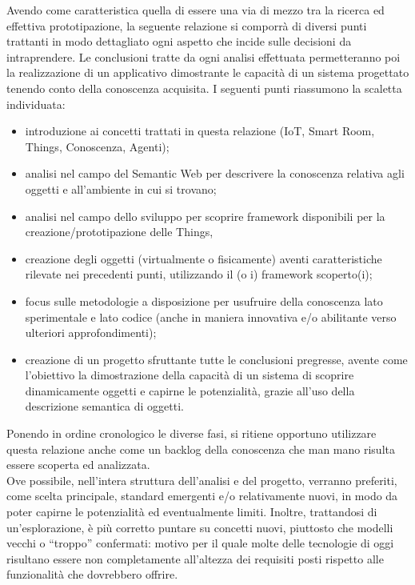 \documentclass[12pt,a4paper,openright,oneside]{report}
\newcommand{\quotes}[1]{``#1''}
\begin{document}
Avendo come caratteristica quella di essere una via di mezzo tra la ricerca ed effettiva prototipazione, la seguente relazione si comporrà di diversi punti trattanti in modo dettagliato ogni aspetto che incide sulle decisioni da intraprendere. Le conclusioni tratte da ogni analisi effettuata permetteranno poi la realizzazione di un applicativo dimostrante le capacità di un sistema progettato tenendo conto della conoscenza acquisita. I seguenti punti riassumono la scaletta individuata:

\begin{itemize}
	\item introduzione ai concetti trattati in questa relazione (IoT, Smart Room, Things, Conoscenza, Agenti);
	
	\item analisi nel campo del Semantic Web per descrivere la conoscenza relativa agli oggetti e all'ambiente in cui si trovano;
	
	\item analisi nel campo dello sviluppo per scoprire framework disponibili per la creazione/prototipazione delle Things,
	
	\item creazione degli oggetti (virtualmente o fisicamente) aventi caratteristiche rilevate nei precedenti punti, utilizzando il (o i) framework scoperto(i);
	
	\item focus sulle metodologie a disposizione per usufruire della conoscenza lato sperimentale e lato codice (anche in maniera innovativa e/o abilitante verso ulteriori approfondimenti);
	
	\item creazione di un progetto sfruttante tutte le conclusioni pregresse, avente come l'obiettivo la dimostrazione della capacità di un sistema di scoprire dinamicamente oggetti e capirne le potenzialità, grazie all'uso della descrizione semantica di oggetti.
	
\end{itemize}

Ponendo in ordine cronologico le diverse fasi, si ritiene opportuno utilizzare questa relazione anche come un backlog della conoscenza che man mano risulta essere scoperta ed analizzata.\\

\label{new_tecnologies}
Ove possibile, nell'intera struttura dell'analisi e del progetto, verranno preferiti, come scelta principale, standard emergenti e/o relativamente nuovi, in modo da poter capirne le potenzialità ed eventualmente limiti. Inoltre, trattandosi di un'esplorazione, è più corretto puntare su concetti nuovi, piuttosto che modelli vecchi o \quotes{troppo} confermati: motivo per il quale molte delle tecnologie di oggi risultano essere non completamente all'altezza dei requisiti posti rispetto alle funzionalità che dovrebbero offrire.
\end{document}
